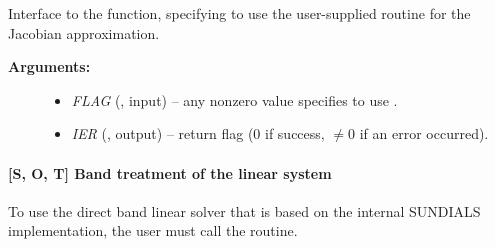 \documentclass[letterpaper,10pt,english]{sphinxmanual}
\begin{document}
\begin{fulllineitems}
\label{f_interface/Usage:f/_/FARKDENSESETJAC}
Interface to the {\hyperref[c_interface/User_callable:ARKDlsSetDenseJacFn]{}} function, specifying
to use the user-supplied routine {\hyperref[f_interface/Usage:f/_/FARKDJAC]{}} for the
Jacobian approximation.
\begin{description}
\item[{\textbf{Arguments:}}] \leavevmode\begin{itemize}
\item {} 
\emph{FLAG} (, input) -- any nonzero value specifies to use
{\hyperref[f_interface/Usage:f/_/FARKDJAC]{}}.

\item {} 
\emph{IER} (, output) -- return flag (0 if success,
$\ne 0$ if an error occurred).

\end{itemize}

\end{description}

\end{fulllineitems}



\paragraph{{[}\textbf{S}, \textbf{O}, \textbf{T}{]} Band treatment of the linear system}
\label{f_interface/Usage:s-o-t-band-treatment-of-the-linear-system}
To use the direct band linear solver that is based on the internal
SUNDIALS implementation, the user must call the {\hyperref[f_interface/Usage:f/_/FARKBAND]{}}
routine.
\end{document}
